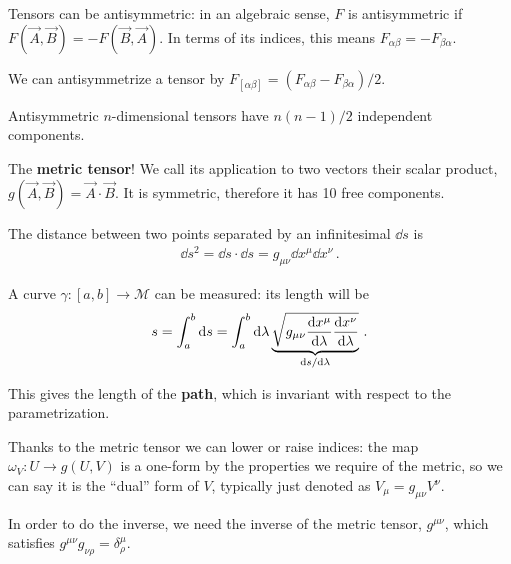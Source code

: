 \documentclass[main.tex]{subfiles}
\begin{document}
Tensors can be antisymmetric: in an algebraic sense, \(F\) is antisymmetric if \(F(\vec{A}, \vec{B}) = - F(\vec{B}, \vec{A})\). 
In terms of its indices, this means \(F_{\alpha \beta } = - F_{\beta \alpha }\). 

We can antisymmetrize a tensor by \(F_{[\alpha \beta ]} = (F_{\alpha \beta } - F_{\beta \alpha }) / 2\). 

Antisymmetric \(n\)-dimensional tensors have \(n(n-1) / 2\) independent components. 

The \textbf{metric tensor}!  We call its application to two vectors their scalar product, \(g(\vec{A}, \vec{B}) = \vec{A} \cdot \vec{B}\). 
It is symmetric, therefore it has 10 free components.

The distance between two points separated by an infinitesimal \(\dd{s}\) is 
%
\begin{align}
\dd{s^2} = \dd{s} \cdot \dd{s} = g_{\mu \nu } \dd{x^{\mu }} \dd{x^{\nu }}
\,.
\end{align}

A curve \(\gamma \colon [a, b] \to \mathcal{M}\) can be measured: its length will be 
%
\begin{align}
s = \int_{a}^{b} \dd{s} = \int_{a}^{b} \dd{\lambda } \underbrace{\sqrt{g_{\mu \nu } \dv{x^{\mu }}{\lambda } \dv{x^{\nu }}{\lambda }}}_{\dv*{s}{\lambda }}
\,.
\end{align}

This gives the length of the \textbf{path}, which is invariant with respect to the parametrization.

Thanks to the metric tensor we can lower or raise indices: 
the map \(\omega _V \colon U \to g(U, V)\) is a one-form by the properties we require of the metric, so we can say it is the ``dual'' form of \(V\), typically just denoted as \(V_\mu = g_{\mu \nu } V^{\nu }\). 

In order to do the inverse, we need the inverse of the metric tensor, \(g^{\mu \nu }\), which satisfies \(g^{\mu \nu } g_{\nu \rho }= \delta^{\mu }_{\rho }\). 
\end{document}

